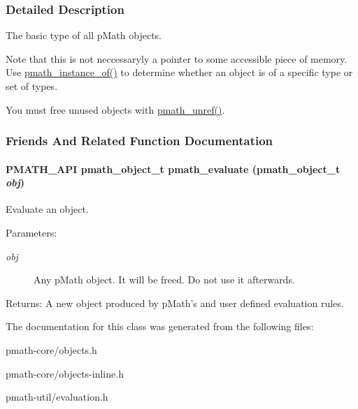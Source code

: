 \subsubsection{Detailed Description}
The basic type of all pMath objects. 

Note that this is not neccessaryly a pointer to some accessible piece of memory. Use \hyperlink{classpmath__object__t_5ac4a06bc219697d09cb1f8c5d87acd9}{pmath\_\-instance\_\-of()} to determine whether an object is of a specific type or set of types.

You must free unused objects with \hyperlink{classpmath__object__t_17295f71102245f7f74b7fd89cfa7584}{pmath\_\-unref()}. 

\subsubsection{Friends And Related Function Documentation}
\hypertarget{classpmath__object__t_adc70af9d7f05843d71d1fc4d3970621}{
\paragraph[{pmath\_\-evaluate}]{\setlength{\rightskip}{0pt plus 5cm}PMATH\_\-API {\bf pmath\_\-object\_\-t} pmath\_\-evaluate ({\bf pmath\_\-object\_\-t} {\em obj})}\hfill}
\label{classpmath__object__t_adc70af9d7f05843d71d1fc4d3970621}


Evaluate an object. 

\begin{Desc}
\item[Parameters:]
\begin{description}
\item[{\em obj}]Any pMath object. It will be freed. Do not use it afterwards. \end{description}
\end{Desc}
\begin{Desc}
\item[Returns:]A new object produced by pMath's and user defined evaluation rules. \end{Desc}


The documentation for this class was generated from the following files:\begin{CompactItemize}
\item 
pmath-core/objects.h\item 
pmath-core/objects-inline.h\item 
pmath-util/evaluation.h\end{CompactItemize}
